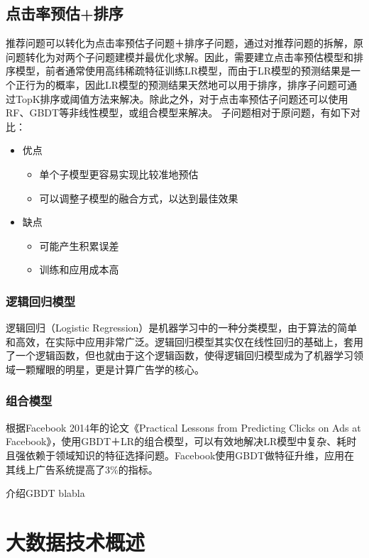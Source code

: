   \subsection{点击率预估+排序}
  推荐问题可以转化为点击率预估子问题＋排序子问题，通过对推荐问题的拆解，原问题转化为对两个子问题建模并最优化求解。因此，需要建立点击率预估模型和排序模型，前者通常使用高纬稀疏特征训练\gls*{LR}模型，而由于LR模型的预测结果是一个正行为的概率，因此LR模型的预测结果天然地可以用于排序，排序子问题可通过TopK排序或阈值方法来解决。除此之外，对于点击率预估子问题还可以使用\gls*{RF}、\gls*{GBDT}等非线性模型，或组合模型来解决。
  子问题相对于原问题，有如下对比：
  \begin{itemize}
  \item 优点
    \begin{itemize}
    \item 单个子模型更容易实现比较准地预估
    \item 可以调整子模型的融合方式，以达到最佳效果
    \end{itemize}
  \item 缺点
    \begin{itemize}
    \item 可能产生积累误差
    \item 训练和应用成本高
    \end{itemize}
  \end{itemize}

    \subsubsection{逻辑回归模型}
    逻辑回归（Logistic Regression）是机器学习中的一种分类模型，由于算法的简单和高效，在实际中应用非常广泛。逻辑回归模型其实仅在线性回归的基础上，套用了一个逻辑函数，但也就由于这个逻辑函数，使得逻辑回归模型成为了机器学习领域一颗耀眼的明星，更是计算广告学的核心。

    \subsubsection{组合模型}
    根据Facebook 2014年的论文《Practical Lessons from Predicting Clicks on Ads at Facebook》\cite{PracticalPredictingFacebook}，使用GBDT＋LR的组合模型，可以有效地解决LR模型中复杂、耗时且强依赖于领域知识的特征选择问题。Facebook使用GBDT做特征升维，应用在其线上广告系统提高了3\%的指标。

    介绍GBDT blabla


\section{大数据技术概述}

